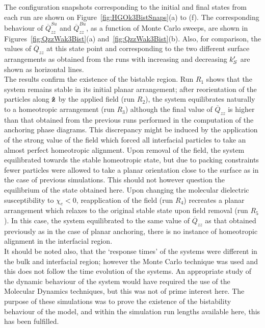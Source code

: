 The configuration snapshots corresponding to the initial and final states from each run are shown on 
Figure~\ref{fig:HGOk3BistSnaps}(a) to (f). The corresponding behaviour of
$\overline{Q}^{Su}_{zz}$ and $\overline{Q}^{Bu}_{zz}$, as a function of Monte Carlo sweeps, are
shown in Figures~\ref{fig:QzzWak3Bist}(a) and~\ref{fig:QzzWak3Bist}(b). Also, for comparison,
the values of $\overline{Q}_{zz}$ at this state point and corresponding to the two different surface
arrangements as obtained from the runs with increasing and decreasing $k_S^{\prime}$ are shown as
horizontal lines.\\
%
The results confirm the existence of the bistable region. 
Run $R_1$ shows that the system remains stable in its initial planar arrangement; after 
reorientation of the particles along $\mathbf{\hat{z} }$ by the applied field (run $R_2$), 
the  system equilibrates naturally to a  homeotropic arrangement (run $R_3$) although the
final value of $\overline{Q}_{zz}$ is higher than that obtained from the previous runs performed
in the computation of the anchoring phase diagrams. This discrepancy might be induced by the
application of the strong value of the field which forced all interfacial particles 
to take an almost perfect homeotropic alignment. Upon removal of the field, 
the system equilibrated towards the stable homeotropic state, but due to packing constraints 
fewer particles were allowed to take a planar orientation close to the surface as in the case 
of previous simulations. This should not however question the equilibrium of the state obtained
here.
%
Upon changing the molecular dielectric susceptibility to $\chi_e<0$, reapplication of the field 
(run $R_4$) recreates a planar arrangement which relaxes to the original stable state 
upon field removal (run $R_5$). In this case, the system equilibrated to the same value of
$\overline{Q}_{zz}$ as that obtained previously as in the case of planar anchoring, there is no
instance of homeotropic alignment in the interfacial region.\\
%
It should be noted also, that the `response times' of the systems were different in the bulk and
interfacial region; however the Monte Carlo technique was used and this does not follow the time
evolution of the systems. An appropriate study of the dynamic behaviour of the system would have
required the use of the Molecular Dynamics techniques, but this was not of prime interest here.
The purpose of these simulations was to prove the existence of the bistability behaviour of the
model, and within the simulation run lengths available here, this has been fulfilled.


